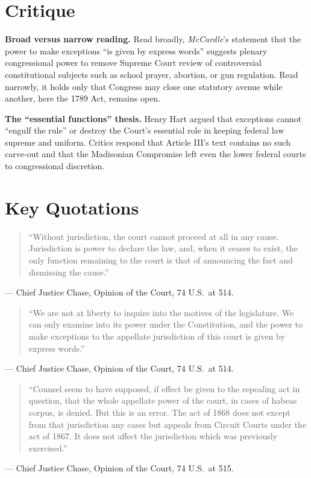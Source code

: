 \documentclass[12pt]{article}
\begin{document}
\section{Critique}

\textbf{Broad versus narrow reading.} Read broadly, \textit{McCardle}'s statement that the power to make exceptions ``is given by express words'' suggests plenary congressional power to remove Supreme Court review of controversial constitutional subjects such as school prayer, abortion, or gun regulation. Read narrowly, it holds only that Congress may close one statutory avenue while another, here the 1789 Act, remains open.

\textbf{The ``essential functions'' thesis.} Henry Hart argued that exceptions cannot ``engulf the rule'' or destroy the Court's essential role in keeping federal law supreme and uniform. Critics respond that Article III's text contains no such carve-out and that the Madisonian Compromise left even the lower federal courts to congressional discretion.

\section{Key Quotations}

\begin{quote}
``Without jurisdiction, the court cannot proceed at all in any cause. Jurisdiction is power to declare the law, and, when it ceases to exist, the only function remaining to the court is that of announcing the fact and dismissing the cause.''
\end{quote}
\noindent --- Chief Justice Chase, Opinion of the Court, 74 U.S.\ at 514.

\begin{quote}
``We are not at liberty to inquire into the motives of the legislature. We can only examine into its power under the Constitution, and the power to make exceptions to the appellate jurisdiction of this court is given by express words.''
\end{quote}
\noindent --- Chief Justice Chase, Opinion of the Court, 74 U.S.\ at 514.

\begin{quote}
``Counsel seem to have supposed, if effect be given to the repealing act in question, that the whole appellate power of the court, in cases of habeas corpus, is denied. But this is an error. The act of 1868 does not except from that jurisdiction any cases but appeals from Circuit Courts under the act of 1867. It does not affect the jurisdiction which was previously exercised.''
\end{quote}
\noindent --- Chief Justice Chase, Opinion of the Court, 74 U.S.\ at 515.
\end{document}
